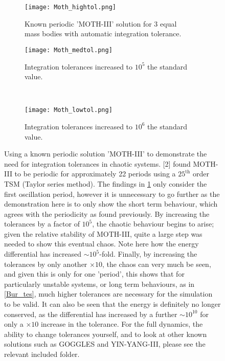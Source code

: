 \documentclass[11pt]{article}
\begin{document}
\begin{figure}[H]
\centering
\begin{subfigure}{.45\textwidth}
	\texttt{[image: Moth\_hightol.png]}
\caption{Known periodic 'MOTH-III' solution for 3 equal\\ mass bodies with automatic integration tolerance.}
\label{Moth_hightol}
\end{subfigure}%
\centering
\begin{subfigure}{.45\textwidth}
	\texttt{[image: Moth\_medtol.png]}
\caption{Integration tolerances increased to $10^5$ the standard value.}
\label{Moth_medtol}
\end{subfigure}\\
\centering
\begin{subfigure}{.45\textwidth}
	\texttt{[image: Moth\_lowtol.png]}
\caption{Integration tolerances increased to $10^6$ the standard value.}
  \label{Moth_lowtol}
\end{subfigure}
\caption{Using a known periodic solution 'MOTH-III' to demonstrate the need for integration tolerances in chaotic systems. [2] found MOTH-III to be periodic for approximately 22 periods using a $25^{\mbox{th}}$ order TSM (Taylor series method). The findings in \ref{Moth_hightol} only consider the first oscillation period, however it is unnecessary to go further as the demonstration here is to only show the short term behaviour, which agrees with the periodicity as found previously. By increasing the tolerances by a factor of $10^{5}$, the chaotic behaviour begins to arise; given the relative stability of MOTH-III, quite a large step was needed to show this eventual chaos. Note here how the energy differential has increased $\sim 10^5$-fold. Finally, by increasing the tolerances by only another $\times 10$, the chaos can very much be seen, and given this is only for one 'period', this shows that for particularly unstable systems, or long term behaviours, as in \ref{Bur_tes}, much higher tolerances are necessary for the simulation to be valid. It can also be seen that the energy is definitely no longer conserved, as the differential has increased by a further $\sim 10^{10}$ for only a $\times 10$ increase in the tolerance. For the full dynamics, the ability to change tolerances yourself, and to look at other known solutions such as GOGGLES and YIN-YANG-III, please see the relevant included folder.}
\label{MOTH-III}
\end{figure}
\newpage
\end{document}
